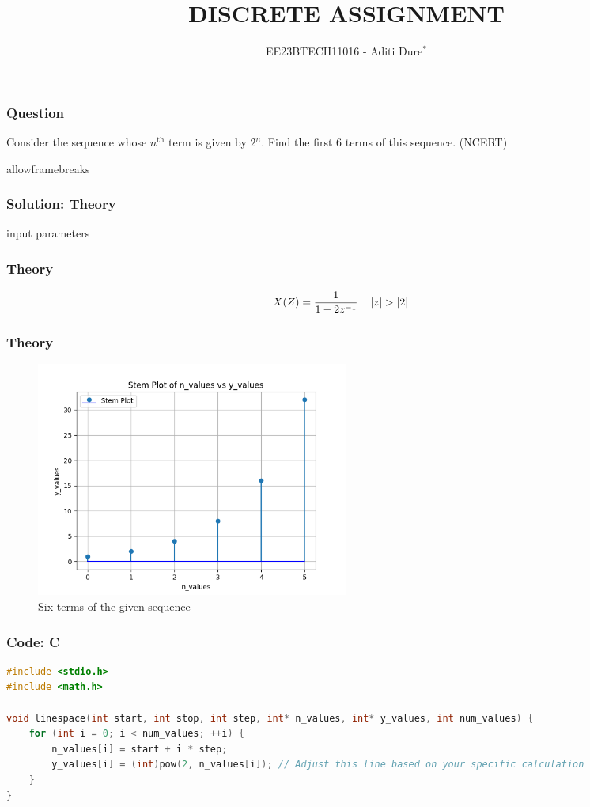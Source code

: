 \documentclass{beamer}
\begin{document}
\title{DISCRETE ASSIGNMENT}
\author{EE23BTECH11016 - Aditi Dure$^{*}$}
\date{}
\frame{\titlepage}

\begin{frame}
\frametitle{Question}
Consider the sequence whose $n^\text{th}$ term is given by \(2^n\). Find the first 6 terms of this sequence. \hfill(NCERT)
\end{frame}

\begin{frame}{allowframebreaks}
\frametitle{Solution: Theory}
\begin{table}[!ht]
    \centering
        
    \caption{input parameters}
    \label{tab:11_9_1_3}
\end{table}
\end{frame}

\begin{frame}
\frametitle{Theory}

\begin{align}
X(Z) &= \frac {1}{1 - 2  z^{-1} } \quad \left\vert z\right\vert>\left\vert2\right\vert
\end{align}

\end{frame}

\begin{frame}
\frametitle{Theory}
 
\begin{figure}[H]
    \centering
    \includegraphics[width=0.5\textwidth]{figs/fig1.png}
    \caption{Six terms of the given sequence}
    \label{fig:11_9_1_3}
\end{figure}
\end{frame}

\begin{frame}[fragile]
\frametitle{Code: C}

\begin{lstlisting}[language=C, basicstyle=\small\ttfamily, breaklines=true, frame=single]
#include <stdio.h>
#include <math.h>

void linespace(int start, int stop, int step, int* n_values, int* y_values, int num_values) {
    for (int i = 0; i < num_values; ++i) {
        n_values[i] = start + i * step;
        y_values[i] = (int)pow(2, n_values[i]); // Adjust this line based on your specific calculation
    }
}
\end{lstlisting}
\end{frame}
\end{document}
